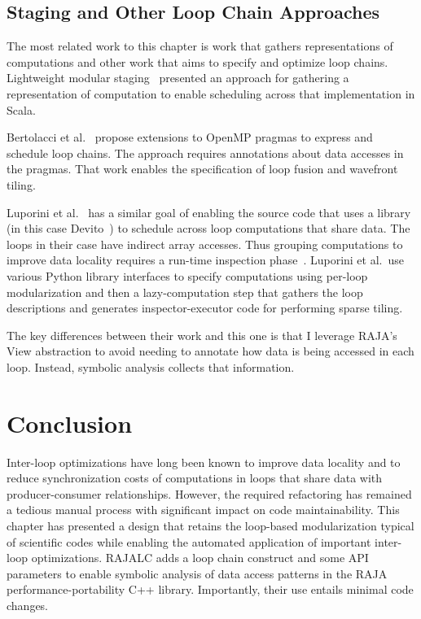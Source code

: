 \subsection{Staging and Other Loop Chain Approaches}

The most related work to this chapter is work that gathers representations of computations and other work that aims to specify and optimize loop chains.
Lightweight modular staging~\cite{LMS2012} presented an approach for gathering 
a representation of computation to enable scheduling across that implementation
in Scala.

Bertolacci et al.~\cite{Bertolacci2016,bertolacci2019using} propose extensions to
OpenMP pragmas to express and schedule loop chains.
The approach requires annotations about data accesses in the pragmas.
That work enables the specification of loop fusion and wavefront tiling. 

Luporini et al.~\cite{Luporini2019} has a similar goal of enabling the source
code that uses a library  (in this case Devito~\cite{Luporini2018}) to
schedule across loop computations that share data.
The loops in their case have indirect array accesses.
Thus grouping computations to improve data locality requires a run-time
inspection phase~\cite{Strout14IPDPS}.
Luporini et al.\ use various Python library interfaces to specify computations
using per-loop modularization and then a lazy-computation step that gathers
the loop descriptions and generates inspector-executor code for performing 
sparse tiling.

The key differences between their work and this one is that I leverage RAJA's View abstraction to avoid needing to annotate how data is being accessed
in each loop.  
Instead, symbolic analysis collects that information.

\section{Conclusion}
Inter-loop optimizations have long been known to improve data locality and 
to reduce synchronization costs of computations in loops that share data
with producer-consumer relationships.
However, the required refactoring has remained a tedious manual process with 
significant impact on code maintainability.
This chapter has presented a design that retains the loop-based modularization typical
of scientific codes while enabling the automated application of important
inter-loop optimizations.
RAJALC adds a loop chain construct and some API parameters to enable symbolic
analysis of data access patterns in the RAJA performance-portability C++
library. 
Importantly, their use entails minimal code changes. 


